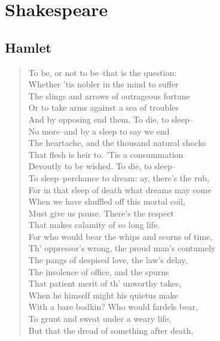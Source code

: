 \documentclass[10pt,a5paper,oneside]{book}
\begin{document}
\part{Shakespeare}

\chapter{Hamlet}

\begin{verse}
To be, or not to be--that is the question:\\
Whether 'tis nobler in the mind to suffer\\
The slings and arrows of outrageous fortune\\
Or to take arms against a sea of troubles\\
And by opposing end them. To die, to sleep--\\
No more--and by a sleep to say we end\\
The heartache, and the thousand natural shocks\\
That flesh is heir to. 'Tis a consummation\\
Devoutly to be wished. To die, to sleep--\\
To sleep--perchance to dream: ay, there's the rub,\\
For in that sleep of death what dreams may come\\
When we have shuffled off this mortal coil,\\
Must give us pause. There's the respect\\
That makes calamity of so long life.\\
For who would bear the whips and scorns of time,\\
Th' oppressor's wrong, the proud man's contumely\\
The pangs of despised love, the law's delay,\\
The insolence of office, and the spurns\\
That patient merit of th' unworthy takes,\\
When he himself might his quietus make\\
With a bare bodkin? Who would fardels bear,\\
To grunt and sweat under a weary life,\\
But that the dread of something after death,\\

\end{verse}
\end{document}
